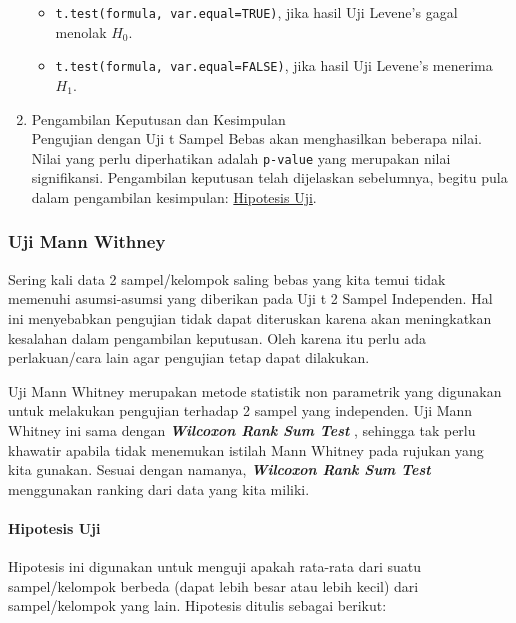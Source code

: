 \documentclass[
]{book}
\providecommand{\tightlist}{%
  \setlength{\itemsep}{0pt}\setlength{\parskip}{0pt}}
\begin{document}
\begin{enumerate}
  \begin{itemize}
  \tightlist
  \item
    \texttt{t.test(formula,\ var.equal=TRUE)}, jika hasil Uji Levene's gagal menolak \(H_0\).
  \item
    \texttt{t.test(formula,\ var.equal=FALSE)}, jika hasil Uji Levene's menerima \(H_1\).
  \end{itemize}
\item
  Pengambilan Keputusan dan Kesimpulan\\
  Pengujian dengan Uji t Sampel Bebas akan menghasilkan beberapa nilai. Nilai yang perlu diperhatikan adalah \texttt{p-value} yang merupakan nilai signifikansi. Pengambilan keputusan telah dijelaskan sebelumnya, begitu pula dalam pengambilan kesimpulan: \protect\hyperlink{a3-hipotesis-t-bebas}{Hipotesis Uji}.
\end{enumerate}

\hypertarget{uji-mann-withney}{%
\subsubsection{Uji Mann Withney}\label{uji-mann-withney}}

Sering kali data 2 sampel/kelompok saling bebas yang kita temui tidak memenuhi asumsi-asumsi yang diberikan pada Uji t 2 Sampel Independen. Hal ini menyebabkan pengujian tidak dapat diteruskan karena akan meningkatkan kesalahan dalam pengambilan keputusan. Oleh karena itu perlu ada perlakuan/cara lain agar pengujian tetap dapat dilakukan.

Uji Mann Whitney merupakan metode statistik non parametrik yang digunakan untuk melakukan pengujian terhadap 2 sampel yang independen. Uji Mann Whitney ini sama dengan \textbf{\emph{Wilcoxon Rank Sum Test}} \citep{chalmer19}, sehingga tak perlu khawatir apabila tidak menemukan istilah Mann Whitney pada rujukan yang kita gunakan. Sesuai dengan namanya, \textbf{\emph{Wilcoxon Rank Sum Test}} menggunakan ranking dari data yang kita miliki.

\hypertarget{a3-hipotesis-m-bebas}{%
\paragraph{Hipotesis Uji}\label{a3-hipotesis-m-bebas}}

Hipotesis ini digunakan untuk menguji apakah rata-rata dari suatu sampel/kelompok berbeda (dapat lebih besar atau lebih kecil) dari sampel/kelompok yang lain. Hipotesis ditulis sebagai berikut:
\end{document}

